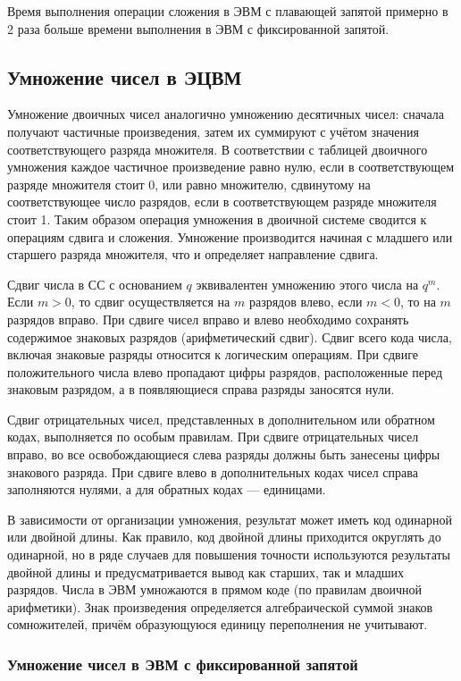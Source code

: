 \documentclass[10pt,a4paper,titlepage]{article}
\begin{document}
Время выполнения операции сложения в ЭВМ с плавающей запятой примерно в 2 раза больше времени выполнения в ЭВМ с фиксированной запятой.

\subsection{Умножение чисел в ЭЦВМ}

Умножение двоичных чисел аналогично умножению десятичных чисел: сначала получают частичные произведения, затем их суммируют с учётом значения соответствующего разряда множителя.
В соответствии с таблицей двоичного умножения каждое частичное произведение равно нулю, если в соответствующем разряде множителя стоит 0, или равно множителю, сдвинутому на соответствующее число разрядов, если в соответствующем разряде множителя стоит 1.
Таким образом операция умножения в двоичной системе сводится к операциям сдвига и сложения.
Умножение производится начиная с младшего или старшего разряда множителя, что и определяет направление сдвига.

Сдвиг числа в СС с основанием $q$ эквивалентен умножению этого числа на $q^m$.
Если $m > 0$, то сдвиг осуществляется на $m$ разрядов влево, если $m < 0$, то на $m$ разрядов вправо.
При сдвиге чисел вправо и влево необходимо сохранять содержимое знаковых разрядов (арифметический сдвиг).
Сдвиг всего кода числа, включая знаковые разряды относится к логическим операциям.
При сдвиге положительного числа влево пропадают цифры разрядов, расположенные перед знаковым разрядом, а в появляющиеся справа разряды заносятся нули.

Сдвиг отрицательных чисел, представленных в дополнительном или обратном кодах, выполняется по особым правилам.
При сдвиге отрицательных чисел вправо, во все освобождающиеся слева разряды должны быть занесены цифры знакового разряда.
При сдвиге влево в дополнительных кодах чисел справа заполняются нулями, а для обратных кодах --- единицами.

В зависимости от организации умножения, результат может иметь код одинарной или двойной длины.
Как правило, код двойной длины приходится округлять до одинарной, но в ряде случаев для повышения точности используются результаты двойной длины и предусматривается вывод как старших, так и младших разрядов.
Числа в ЭВМ умножаются в прямом коде (по правилам двоичной арифметики).
Знак произведения определяется алгебраической суммой знаков сомножителей, причём образующуюся единицу переполнения не учитывают.

\subsubsection{Умножение чисел в ЭВМ с фиксированной запятой}
\end{document}
